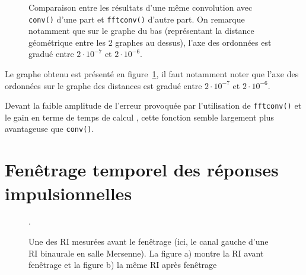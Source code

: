\begin{figure}[h!]
\caption{\label{comp_conv_fftconv}Comparaison entre les résultats d'une même convolution avec \texttt{conv()} d'une part
et \texttt{fftconv()} d'autre part. On remarque notamment que sur le graphe du bas (représentant la distance géométrique
entre les 2 graphes au dessus), l'axe des ordonnées est gradué entre $2\cdot10^{-7}$ et $2\cdot10^{-6}$.}
\end{figure}

Le graphe obtenu est présenté en figure~\ref{comp_conv_fftconv}, il faut notamment noter que l'axe des ordonnées sur
le graphe des distances est gradué entre $2\cdot10^{-7}$ et $2\cdot10^{-6}$.

Devant la faible amplitude de l'erreur provoquée par l'utilisation de \texttt{fftconv()} et le gain en terme de temps de calcul
, cette fonction semble largement plus avantageuse que \texttt{conv()}.

\section{Fenêtrage temporel des réponses impulsionnelles} %

\begin{figure}[h!]
\caption{\label{ri_non_recoupee}Une des RI mesurées avant le fenêtrage (ici, le canal gauche d'une RI binaurale en salle
Mersenne). La figure a) montre la RI avant fenêtrage et la figure b) la même RI après fenêtrage}.
\end{figure}

